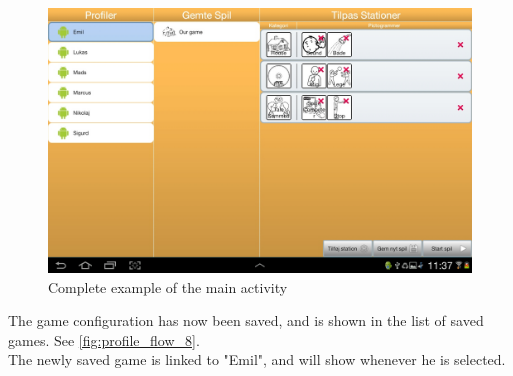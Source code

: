 \begin{figure}[H]
\centering
\includegraphics[width=1.0\linewidth]{img/screenshots/profile_flow_8.jpg}%
\caption{Complete example of the main activity}
\label{fig:profile_flow_8}
\end{figure}

The game configuration has now been saved, and is shown in the list of saved games. See \autoref{fig:profile_flow_8}.\\
The newly saved game is linked to "Emil", and will show whenever he is selected.
